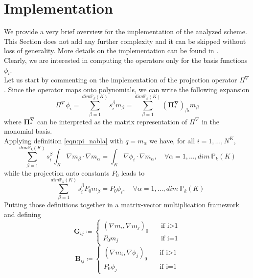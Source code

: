 \documentclass[10pt]{article}
\newcommand{\mymatrix}[1]{\mathbf{#1}}
\begin{document}
\section{Implementation} \label{sec:implementation}
We provide a very brief overview for the implementation of the analyzed scheme. This Section does not add any further complexity and it can be skipped without loss of generality. More details on the implementation can be found in \cite{hitchhiker}. \\
Clearly, we are interested in computing the operators only for the basis functions $\phi_i$. \\
Let us start by commenting on the implementation of the projection operator $\Pi^\nabla$. Since the operator maps onto polynomials, we can write the following expansion
$$\Pi^\nabla \phi_i= \sum_{\beta=1}^{dim \mathbb{P}_k(K)} s_i^\beta m_\beta = \sum_{\beta=1}^{dim \mathbb{P}_k(K)} (\mymatrix{\Pi^\nabla_*})_{\beta i} m_\beta$$
where $\mymatrix{\Pi^\nabla_*}$ can be interpreted as the matrix representation of $\Pi^\nabla$ in the monomial basis. \\
Applying definition \eqref{eqn:pi_nabla} with $q=m_\alpha$ we have, for all $i=1,\dots,N^K$, 
\begin{equation}
	\sum_{\beta=1}^{dim \mathbb{P}_k(K)} s^\beta_i \int_{K}\nabla m_\beta \cdot \nabla m_\alpha = \int_K \nabla \phi_i \cdot \nabla m_\alpha, \quad \forall \alpha=1,\dots,dim \ \mathbb{P}_k(K)
\end{equation}
while the projection onto constants $P_0$ leads to
\begin{equation}
	\sum_{\beta=1}^{dim \mathbb{P}_k(K)} s^\beta_i P_0 m_\beta = P_0 \phi_i, \quad \forall \alpha=1,\dots,dim \ \mathbb{P}_k(K)
\end{equation}
Putting those definitions together in a matrix-vector multiplication framework and defining
\begin{equation}
	\mymatrix{G}_{ij} \coloneqq
	\begin{cases}
	(\nabla m_i, \nabla m_j)_0 \quad &\mbox{if i>1} \\
	P_0 m_j  \quad &\mbox{if i=1}
	\end{cases}	
\end{equation}
\begin{equation}
\mymatrix{B}_{ij} \coloneqq
\begin{cases}
(\nabla m_i, \nabla \phi_j)_0 \quad &\mbox{if i>1} \\
P_0 \phi_j  \quad &\mbox{if i=1}
\end{cases}	
\end{equation}
\end{document}
